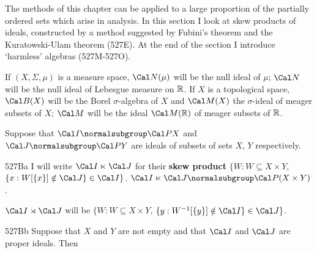 \discrpage


\def\chaptername{Cardinal functions of measure theory}
\def\sectionname{Skew products of ideals}

\def\CalMk{\Cal{M}\eurm{k}}
\def\CalSmz{\Cal{S}\eurm{mz}}
\def\rti{right-{\vthsp}translation-{\vthsp}invariant}


The methods of this chapter can be applied to a large proportion of the
partially ordered sets which arise in analysis.   In this section I
look at skew products of ideals,
constructed by a method suggested by Fubini's theorem and the
Kuratowski-Ulam theorem (527E).   At the end of the section I introduce
`harmless' algebras (527M-527O).  %

 If $(X,\Sigma,\mu)$ is a measure space,
$\Cal N(\mu)$ will be the null ideal of $\mu$;
$\Cal N$ will be the null ideal of Lebesgue measure on $\Bbb R$.
If $X$ is a topological space, $\Cal B(X)$ will be the Borel
$\sigma$-algebra of $X$ and $\Cal M(X)$ the $\sigma$-ideal of meager
subsets of $X$;  $\Cal M$ will be the ideal
$\Cal M(\Bbb R)$ of meager subsets of $\Bbb R$.

 Suppose that
$\Cal I\normalsubgroup\Cal PX$ and $\Cal J\normalsubgroup\Cal PY$ are
ideals of subsets of sets $X$, $Y$ respectively.

\spheader 527Ba I will write $\Cal I\ltimes\Cal J$  for their
{\bf skew product}
$\{W:W\subseteq X\times Y$, $\{x:W[\{x\}]\notin\Cal J\}\in\Cal I\}$.
$\Cal I\ltimes\Cal J\normalsubgroup\Cal P(X\times Y)$.

$\Cal I\rtimes\Cal J$ will be
$\{W:W\subseteq X\times Y$, $\{y:W^{-1}[\{y\}]\notin\Cal I\}\in\Cal J\}$.

\spheader 527Bb Suppose that $X$ and $Y$ are not empty and that $\Cal I$
and $\Cal J$ are proper ideals.   Then



